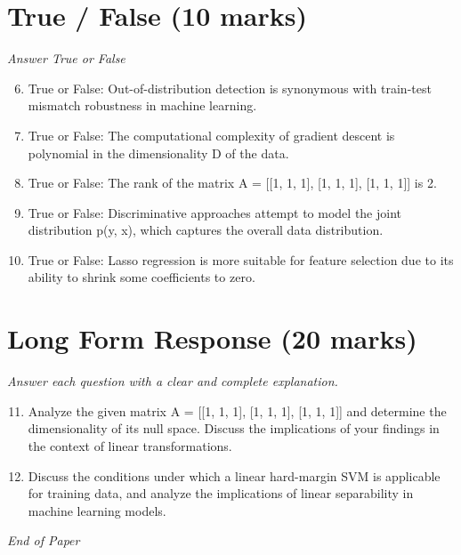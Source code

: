 \documentclass[12pt]{article}
\begin{document}
\section*{True / False (10 marks)}
\textit{Answer True or False}
\begin{enumerate}[label=\arabic*.]
\setcounter{enumi}{5}
\item True or False: Out-of-distribution detection is synonymous with train-test mismatch robustness in machine learning.
\item True or False: The computational complexity of gradient descent is polynomial in the dimensionality D of the data.
\item True or False: The rank of the matrix A = [[1, 1, 1], [1, 1, 1], [1, 1, 1]] is 2.
\item True or False: Discriminative approaches attempt to model the joint distribution p(y, x), which captures the overall data distribution.
\item True or False: Lasso regression is more suitable for feature selection due to its ability to shrink some coefficients to zero.
\end{enumerate}

\section*{Long Form Response (20 marks)}
\textit{Answer each question with a clear and complete explanation.}
\begin{enumerate}[label=\arabic*.]
\setcounter{enumi}{10}
\item Analyze the given matrix A = [[1, 1, 1], [1, 1, 1], [1, 1, 1]] and determine the dimensionality of its null space. Discuss the implications of your findings in the context of linear transformations.
\item Discuss the conditions under which a linear hard-margin SVM is applicable for training data, and analyze the implications of linear separability in machine learning models.
\end{enumerate}

\vfill
\noindent\textit{End of Paper}
\end{document}
